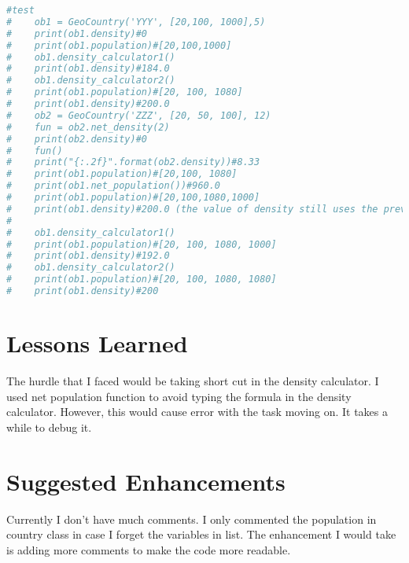 \documentclass[letterpaper,12pt, scrartcl]{article}
\begin{document}
\begin{lstlisting}[language=Python, caption=My Code]
    #test
#    ob1 = GeoCountry('YYY', [20,100, 1000],5)
#    print(ob1.density)#0
#    print(ob1.population)#[20,100,1000]
#    ob1.density_calculator1()
#    print(ob1.density)#184.0
#    ob1.density_calculator2()
#    print(ob1.population)#[20, 100, 1080]
#    print(ob1.density)#200.0
#    ob2 = GeoCountry('ZZZ', [20, 50, 100], 12)
#    fun = ob2.net_density(2)
#    print(ob2.density)#0
#    fun()
#    print("{:.2f}".format(ob2.density))#8.33
#    print(ob1.population)#[20,100, 1080]
#    print(ob1.net_population())#960.0
#    print(ob1.population)#[20,100,1080,1000]
#    print(ob1.density)#200.0 (the value of density still uses the previous value of population population)
#
#    ob1.density_calculator1()
#    print(ob1.population)#[20, 100, 1080, 1000]
#    print(ob1.density)#192.0
#    ob1.density_calculator2()
#    print(ob1.population)#[20, 100, 1080, 1080]
#    print(ob1.density)#200

\end{lstlisting}
\section{Lessons Learned}
The hurdle that I faced would be taking short cut in the density calculator. I used net population function to avoid typing the formula in the density calculator. However, this would cause error with the task moving on. It takes a while to debug it.
\section{Suggested Enhancements}
Currently I don't have much comments. I only commented the population in country class in case I forget the variables in list. The enhancement I would take is adding more comments to make the code more readable.
\end{document}
